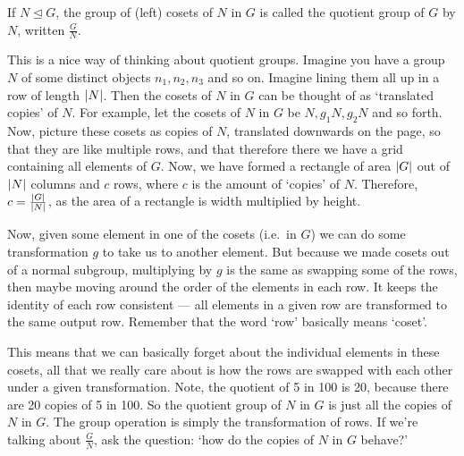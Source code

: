 \begin{definition}
	If \(N \trianglelefteq G\), the group of (left) cosets of \(N\) in \(G\) is called the quotient group of \(G\) by \(N\), written \(\frac{G}{N}\).
\end{definition}

This is a nice way of thinking about quotient groups. Imagine you have a group \(N\) of some distinct objects \(n_1, n_2, n_3\) and so on. Imagine lining them all up in a row of length \(\abs{N}\). Then the cosets of \(N\) in \(G\) can be thought of as `translated copies' of \(N\). For example, let the cosets of \(N\) in \(G\) be \(N, g_1N, g_2N\) and so forth. Now, picture these cosets as copies of \(N\), translated downwards on the page, so that they are like multiple rows, and that therefore there we have a grid containing all elements of \(G\). Now, we have formed a rectangle of area \(\abs{G}\) out of \(\abs{N}\) columns and \(c\) rows, where \(c\) is the amount of `copies' of \(N\). Therefore, \(c = \frac{\abs{G}}{\abs{N}}\), as the area of a rectangle is width multiplied by height.

Now, given some element in one of the cosets (i.e.\ in \(G\)) we can do some transformation \(g\) to take us to another element. But because we made cosets out of a normal subgroup, multiplying by \(g\) is the same as swapping some of the rows, then maybe moving around the order of the elements in each row. It keeps the identity of each row consistent --- all elements in a given row are transformed to the same output row. Remember that the word `row' basically means `coset'.

This means that we can basically forget about the individual elements in these cosets, all that we really care about is how the rows are swapped with each other under a given transformation. Note, the quotient of 5 in 100 is 20, because there are 20 copies of 5 in 100. So the quotient group of \(N\) in \(G\) is just all the copies of \(N\) in \(G\). The group operation is simply the transformation of rows. If we're talking about \(\frac{G}{N}\), ask the question: `how do the copies of \(N\) in \(G\) behave?'

